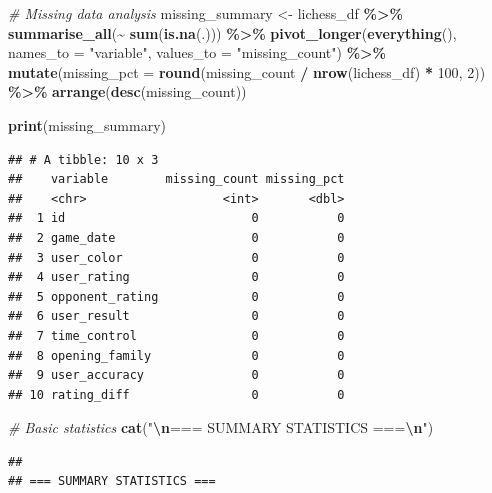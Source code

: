 \documentclass[
]{article}
\newenvironment{Shaded}{\begin{snugshade}}{\end{snugshade}}
\newcommand{\AttributeTok}[1]{\textcolor[rgb]{0.13,0.29,0.53}{#1}}
\newcommand{\CommentTok}[1]{\textcolor[rgb]{0.56,0.35,0.01}{\textit{#1}}}
\newcommand{\DecValTok}[1]{\textcolor[rgb]{0.00,0.00,0.81}{#1}}
\newcommand{\FunctionTok}[1]{\textcolor[rgb]{0.13,0.29,0.53}{\textbf{#1}}}
\newcommand{\NormalTok}[1]{#1}
\newcommand{\OtherTok}[1]{\textcolor[rgb]{0.56,0.35,0.01}{#1}}
\newcommand{\SpecialCharTok}[1]{\textcolor[rgb]{0.81,0.36,0.00}{\textbf{#1}}}
\newcommand{\StringTok}[1]{\textcolor[rgb]{0.31,0.60,0.02}{#1}}
\begin{document}
\begin{Shaded}
\begin{Highlighting}[]
\CommentTok{\# Missing data analysis}
\NormalTok{missing\_summary }\OtherTok{\textless{}{-}}\NormalTok{ lichess\_df }\SpecialCharTok{\%\textgreater{}\%}
  \FunctionTok{summarise\_all}\NormalTok{(}\SpecialCharTok{\textasciitilde{}} \FunctionTok{sum}\NormalTok{(}\FunctionTok{is.na}\NormalTok{(.))) }\SpecialCharTok{\%\textgreater{}\%}
  \FunctionTok{pivot\_longer}\NormalTok{(}\FunctionTok{everything}\NormalTok{(), }\AttributeTok{names\_to =} \StringTok{"variable"}\NormalTok{, }\AttributeTok{values\_to =} \StringTok{"missing\_count"}\NormalTok{) }\SpecialCharTok{\%\textgreater{}\%}
  \FunctionTok{mutate}\NormalTok{(}\AttributeTok{missing\_pct =} \FunctionTok{round}\NormalTok{(missing\_count }\SpecialCharTok{/} \FunctionTok{nrow}\NormalTok{(lichess\_df) }\SpecialCharTok{*} \DecValTok{100}\NormalTok{, }\DecValTok{2}\NormalTok{)) }\SpecialCharTok{\%\textgreater{}\%}
  \FunctionTok{arrange}\NormalTok{(}\FunctionTok{desc}\NormalTok{(missing\_count))}

\FunctionTok{print}\NormalTok{(missing\_summary)}
\end{Highlighting}
\end{Shaded}

\begin{verbatim}
## # A tibble: 10 x 3
##    variable        missing_count missing_pct
##    <chr>                   <int>       <dbl>
##  1 id                          0           0
##  2 game_date                   0           0
##  3 user_color                  0           0
##  4 user_rating                 0           0
##  5 opponent_rating             0           0
##  6 user_result                 0           0
##  7 time_control                0           0
##  8 opening_family              0           0
##  9 user_accuracy               0           0
## 10 rating_diff                 0           0
\end{verbatim}

\begin{Shaded}
\begin{Highlighting}[]
\CommentTok{\# Basic statistics}
\FunctionTok{cat}\NormalTok{(}\StringTok{"}\SpecialCharTok{\textbackslash{}n}\StringTok{=== SUMMARY STATISTICS ===}\SpecialCharTok{\textbackslash{}n}\StringTok{"}\NormalTok{)}
\end{Highlighting}
\end{Shaded}

\begin{verbatim}
## 
## === SUMMARY STATISTICS ===
\end{verbatim}
\end{document}
